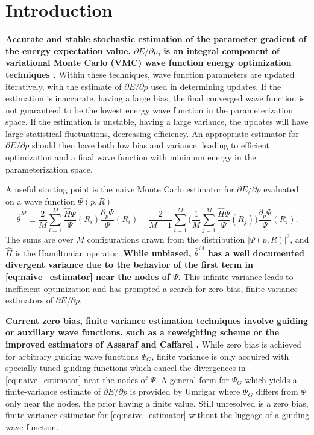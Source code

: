 \documentclass{article}
\begin{document}
\section{Introduction}
\textbf{Accurate and stable stochastic estimation of the parameter gradient of the energy expectation value, $\partial E/\partial p$, is an integral component of variational Monte Carlo (VMC) wave function energy optimization techniques \cite{PhysRevB.64.024512, doi:10.1063/1.1604379, Toulouse2007}.}
Within these techniques, wave function parameters are updated iteratively, with the estimate of $\partial E/\partial p$ used in determining updates.
If the estimation is inaccurate, having a large bias, the final converged wave function is not guaranteed to be the lowest energy wave function in the parameterization space.
If the estimation is unstable, having a large variance, the updates will have large statistical fluctuations, decreasing efficiency.
An appropriate estimator for $\partial E/ \partial p$ should then have both low bias and variance, leading to efficient optimization and a final wave function with minimum energy in the parameterization space.

A useful starting point is the naive Monte Carlo estimator for $\partial E/\partial p$ evaluated on a wave function $\Psi(p, R)$ 
\begin{equation}
\hat{\theta}^M \equiv \frac{2}{M}\sum_{i=1}^M \frac{\hat{H}\Psi}{\Psi}(R_i) \frac{\partial_p \Psi}{\Psi}(R_i) - \frac{2}{M-1} \sum_{i=1}^M \Big(\frac{1}{M} \sum_{j=1}^M \frac{\hat{H}\Psi}{\Psi}(R_j)\Big)\frac{\partial_p \Psi}{\Psi}(R_i). \label{eq:naive_estimator}
\end{equation}
The sums are over $M$ configurations drawn from the distribution $|\Psi(p, R)|^2$, and $\hat{H}$ is the Hamiltonian operator.
\textbf{While unbiased, $\hat{\theta}^M$ has a well documented divergent variance \cite{Avella} due to the behavior of the first term in \eqref{eq:naive_estimator} near the nodes of $\Psi$.}
This infinite variance leads to inefficient optimization and has prompted a search for zero bias, finite variance estimators of $\partial E/\partial p$.

\textbf{Current zero bias, finite variance estimation techniques involve guiding or auxiliary wave functions, such as a reweighting scheme \cite{Avella, Attaccalite2008} or the improved estimators of Assaraf and Caffarel \cite{doi:10.1063/1.1286598, Assaraf2003}.}
While zero bias is achieved for arbitrary guiding wave functions $\Psi_G$, finite variance is only acquired with specially tuned guiding functions which cancel the divergences in \eqref{eq:naive_estimator} near the nodes of $\Psi$.
A general form for $\Psi_G$ which yields a finite-variance estimate of $\partial E/\partial p$ is provided by Umrigar \cite{doi:10.1063/1.4933112} where $\Psi_G$ differs from $\Psi$ only near the nodes, the prior having a finite value.
Still unresolved is a zero bias, finite variance estimator for \eqref{eq:naive_estimator} without the luggage of a guiding wave function. 
\end{document}

